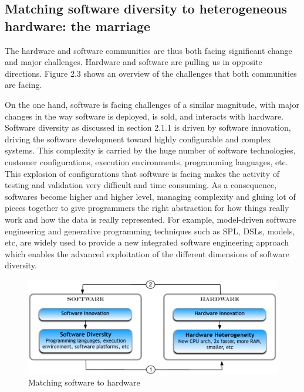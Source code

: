 
\subsection{Matching software diversity to heterogeneous hardware: the marriage}



The hardware and software communities are thus both facing significant change and major challenges. Hardware and software are pulling us in opposite directions. Figure 2.3 shows an overview of the challenges that both communities are facing.  

On the one hand, software is facing challenges of a similar magnitude, with major changes in the way software is deployed, is sold, and interacts with hardware. 
Software diversity as discussed in section 2.1.1 is driven by software innovation, driving the software development toward highly configurable and complex systems. This complexity is carried by the huge number of software technologies, customer configurations, execution environments, programming languages, etc. This explosion of configurations that software is facing makes the activity of testing and validation very difficult and time consuming. 
As a consequence, softwares become higher and higher level, managing complexity and gluing lot of pieces together to give programmers the right abstraction for how things really work and how the data is really represented. 
For example, model-driven software engineering and generative programming techniques such as SPL, DSLs, models, etc, are widely used to provide a new integrated software engineering approach which enables the advanced exploitation of the different dimensions of software diversity.

\begin{figure}[h]
	\center
	\includegraphics[scale=0.65]{Background/fig/marriage}
	\caption{Matching software to hardware}
\end{figure}

